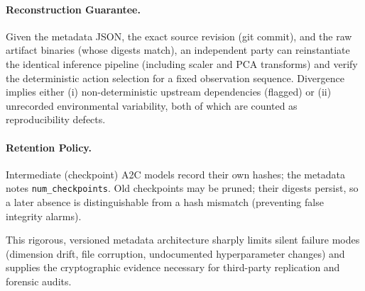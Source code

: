 \paragraph{Reconstruction Guarantee.} Given the metadata JSON, the exact source revision (git commit), and the raw artifact binaries (whose digests match), an independent party can reinstantiate the identical inference pipeline (including scaler and PCA transforms) and verify the deterministic action selection for a fixed observation sequence. Divergence implies either (i) non-deterministic upstream dependencies (flagged) or (ii) unrecorded environmental variability, both of which are counted as reproducibility defects.

\paragraph{Retention Policy.} Intermediate (checkpoint) A2C models record their own hashes; the metadata notes \texttt{num\_checkpoints}. Old checkpoints may be pruned; their digests persist, so a later absence is distinguishable from a hash mismatch (preventing false integrity alarms).

This rigorous, versioned metadata architecture sharply limits silent failure modes (dimension drift, file corruption, undocumented hyperparameter changes) and supplies the cryptographic evidence necessary for third-party replication and forensic audits.
